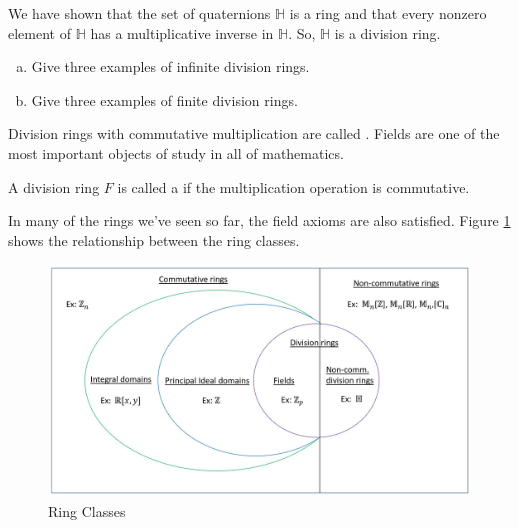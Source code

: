 We have shown that the set of quaternions ${\mathbb H}$ is a ring and that every nonzero element of ${\mathbb H}$ has a multiplicative inverse in ${\mathbb H}$.  So, ${\mathbb H}$ is a division ring.


\begin{exercise}{}
\begin{enumerate}[(a)]
\item
Give three examples of infinite division rings.
\item
Give three examples of finite division rings.
\end{enumerate}
\end{exercise}

Division rings with commutative multiplication are called .  Fields are one of the most important objects of study in all of mathematics.

\begin{defn} \label{def:field}
A division ring $F$ is called a  if the multiplication operation is commutative. \end{defn}

In many of the rings we've seen so far, the field axioms are also satisfied.  Figure \ref{fig:ring_classes} shows the relationship between the ring classes.

\begin{figure}[H]
\centerline {
\includegraphics[width=5.5in]{images/RingClasses.jpg} }
\caption{Ring Classes}\label{fig:ring_classes}
\end{figure}

